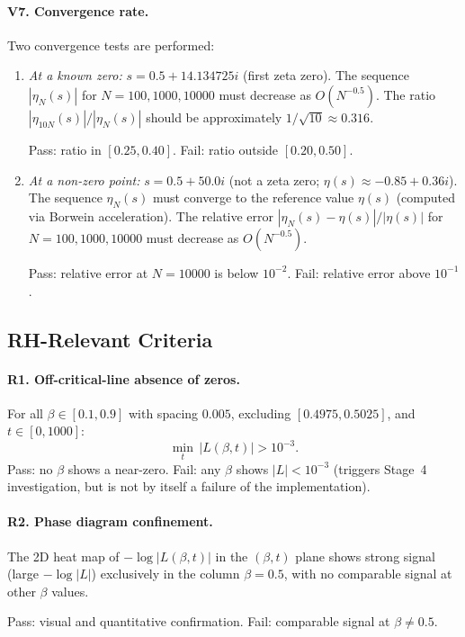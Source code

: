 \paragraph{V7. Convergence rate.}
Two convergence tests are performed:
\begin{enumerate}
  \item[(a)] \emph{At a known zero:} $s = 0.5 + 14.134725i$ (first zeta zero). The
             sequence $|\eta_N(s)|$ for $N = 100, 1000, 10000$ must decrease as
             $O(N^{-0.5})$. The ratio $|\eta_{10N}(s)|/|\eta_N(s)|$ should be
             approximately $1/\sqrt{10} \approx 0.316$.

             Pass: ratio in $[0.25, 0.40]$. Fail: ratio outside $[0.20, 0.50]$.

  \item[(b)] \emph{At a non-zero point:} $s = 0.5 + 50.0i$ (not a zeta zero;
             $\eta(s) \approx -0.85 + 0.36i$). The sequence $\eta_N(s)$ must converge to
             the reference value $\eta(s)$ (computed via Borwein acceleration). The
             relative error $|\eta_N(s) - \eta(s)|/|\eta(s)|$ for $N = 100, 1000, 10000$
             must decrease as $O(N^{-0.5})$.

             Pass: relative error at $N = 10000$ is below $10^{-2}$. Fail: relative
             error above $10^{-1}$.
\end{enumerate}


\subsection{RH-Relevant Criteria}
\label{sec:rh-criteria}

\paragraph{R1. Off-critical-line absence of zeros.}
For all $\beta \in [0.1, 0.9]$ with spacing $0.005$, excluding $[0.4975, 0.5025]$, and
$t \in [0, 1000]$:
\begin{equation}\label{eq:R1}
  \min_{t}\,|L(\beta, t)| > 10^{-3}.
\end{equation}
Pass: no $\beta$ shows a near-zero. Fail: any $\beta$ shows $|L| < 10^{-3}$ (triggers
Stage~4 investigation, but is not by itself a failure of the implementation).

\paragraph{R2. Phase diagram confinement.}
The 2D heat map of $-\log|L(\beta, t)|$ in the $(\beta, t)$ plane shows strong signal
(large $-\log|L|$) exclusively in the column $\beta = 0.5$, with no comparable signal at
other $\beta$ values.

Pass: visual and quantitative confirmation. Fail: comparable signal at $\beta \neq 0.5$.
